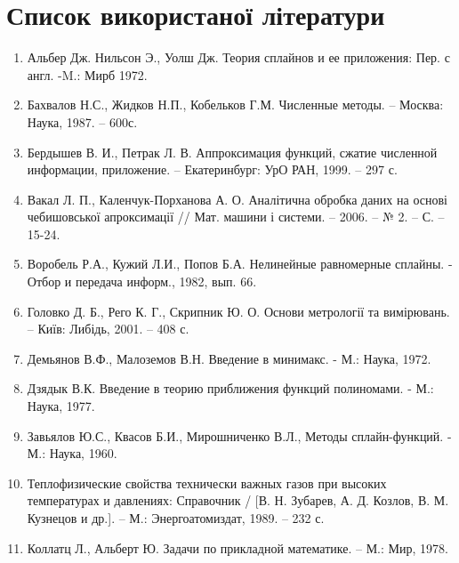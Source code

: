 \documentclass[ukrainian,14pt]{extarticle}
\begin{document}
\newpage

\section*{Список використаної літератури}

\begin{enumerate}

\item Альбер Дж. Нильсон Э., Уолш Дж. Теория сплайнов и ее приложения: Пер. с англ. -M.: Мирб 1972.

\item Бахвалов Н.С., Жидков Н.П., Кобельков Г.М. Численные методы. –
Москва: Наука, 1987. – 600с.

\item Бердышев В. И., Петрак Л. В. Аппроксимация функций, сжатие
численной информации, приложение. – Екатеринбург: УрО РАН, 1999. –
297 с.

\item Вакал Л. П., Каленчук-Порханова А. О. Аналітична обробка даних на
основі чебишовської апроксимації // Мат. машини і системи. – 2006. – № 2. – С. –
15-24.

\item Воробель Р.А., Кужий Л.И., Попов Б.А. Нелинейные равномерные сплайны. - Отбор и передача информ., 1982, вып. 66.

\item Головко Д. Б., Рего К. Г., Скрипник Ю. О. Основи метрології та
вимірювань. – Київ: Либідь, 2001. – 408 с.

\item Демьянов В.Ф., Малоземов В.Н. Введение в минимакс. - М.: Наука, 1972.

\item Дзядык В.К. Введение в теорию приближения функций полиномами. - М.: Наука, 1977.

\item Завьялов Ю.С., Квасов Б.И., Мирошниченко В.Л., Методы сплайн-функций. - М.: Наука, 1960.

\item Теплофизические свойства технически важных газов при высоких
температурах и давлениях: Справочник / [В. Н. Зубарев, А. Д. Козлов, В.
М. Кузнецов и др.]. – М.: Энергоатомиздат, 1989. – 232 с.

\item Коллатц Л., Альберт Ю. Задачи по прикладной математике. – М.: Мир, 1978.


\end{enumerate}
\end{document}
